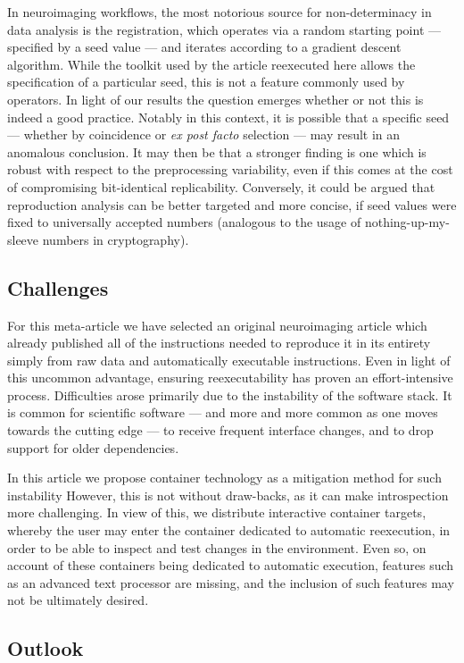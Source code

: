 In neuroimaging workflows, the most notorious source for non-determinacy in data analysis is the registration, which operates via a random starting point — specified by a seed value — and iterates according to a gradient descent algorithm.
While the toolkit used by the article reexecuted here allows the specification of a particular seed, this is not a feature commonly used by operators.
In light of our results the question emerges whether or not this is indeed a good practice.
Notably in this context, it is possible that a specific seed — whether by coincidence or \textit{ex post facto} selection — may result in an anomalous conclusion.
It may then be that a stronger finding is one which is robust with respect to the preprocessing variability, even if this comes at the cost of compromising bit-identical replicability.
Conversely, it could be argued that reproduction analysis can be better targeted and more concise, if seed values were fixed to universally accepted numbers (analogous to the usage of nothing-up-my-sleeve numbers in cryptography).

\subsection{Challenges}
For this meta-article we have selected an original neuroimaging article which already published all of the instructions needed to reproduce it in its entirety simply from raw data and automatically executable instructions.
Even in light of this uncommon advantage, ensuring reexecutability has proven an effort-intensive process.
Difficulties arose primarily due to the instability of the software stack.
It is common for scientific software — and more and more common as one moves towards the cutting edge — to receive frequent interface changes, and to drop support for older dependencies.

In this article we propose container technology as a mitigation method for such instability
However, this is not without draw-backs, as it can make introspection more challenging.
In view of this, we distribute interactive container targets, whereby the user may enter the container dedicated to automatic reexecution, in order to be able to inspect and test changes in the environment.
Even so, on account of these containers being dedicated to automatic execution, features such as an advanced text processor are missing, and the inclusion of such features may not be ultimately desired.

\subsection{Outlook}

